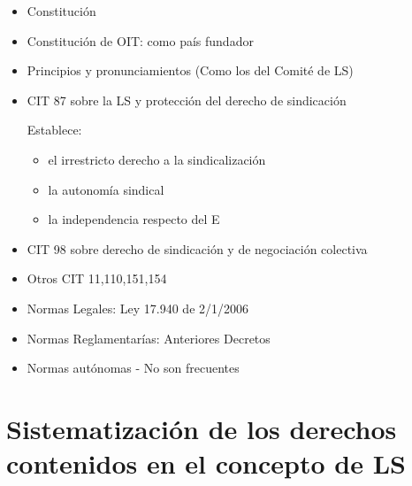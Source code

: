 \documentclass[spanish,12pt,a4paper,titlepage]{report}
\begin{document}
\begin{itemize}
\item Constitución
\item Constitución de OIT: como país fundador
\item Principios y pronunciamientos (Como los del Comité de LS)
\item CIT 87 sobre la LS y protección del derecho de sindicación

Establece:
	\begin{itemize}
	\item el irrestricto derecho a la 		sindicalización
	\item la autonomía sindical
	\item la independencia respecto 		del E
	\end{itemize}
\item CIT 98 sobre derecho de sindicación y de negociación colectiva
\item Otros CIT 11,110,151,154
\item Normas Legales: Ley 17.940 de 2/1/2006 		
\item Normas Reglamentarías: Anteriores Decretos
\item Normas autónomas - No son frecuentes	

\end{itemize}

\section{Sistematización de los derechos contenidos en el concepto de LS}
\end{document}
